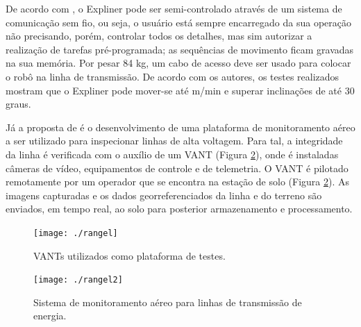 De acordo com , o Expliner pode ser semi-controlado através de um sistema de comunicação sem fio, ou seja, o usuário está sempre encarregado da sua operação não precisando, porém, controlar todos os detalhes, mas sim autorizar a realização de tarefas pré-programada; as sequências de movimento ficam gravadas na sua memória. Por pesar 84 kg, um cabo de acesso deve ser usado para colocar o robô na linha de transmissão.  De acordo com os autores, os testes realizados mostram que o Expliner pode mover-se até m/min e superar inclinações de até 30 graus. 

Já a proposta de  é o desenvolvimento de uma plataforma de monitoramento aéreo a ser utilizado para inspecionar linhas de alta voltagem. Para tal, a integridade da linha é verificada com o auxílio de um VANT (Figura \ref{img:rangel2}), onde é instaladas câmeras de vídeo, equipamentos de controle e de telemetria. O VANT é pilotado remotamente por um operador que se encontra na estação de solo (Figura \ref{img:rangel2}). As imagens capturadas e os dados georreferenciados da linha e do terreno são enviados, em tempo real, ao solo para posterior armazenamento e processamento.

\begin{figure} [h!]	
	\caption{VANTs utilizados como plataforma de testes.}
	\label{img:rangel1}											 
	\centering													 
	\texttt{[image: ./rangel]}
\end{figure}													 

\begin{figure} [h!]	
	\caption{Sistema de monitoramento aéreo para linhas de transmissão de energia.}
	\label{img:rangel2}											 
	\centering													 
	\texttt{[image: ./rangel2]}
\end{figure}													 

